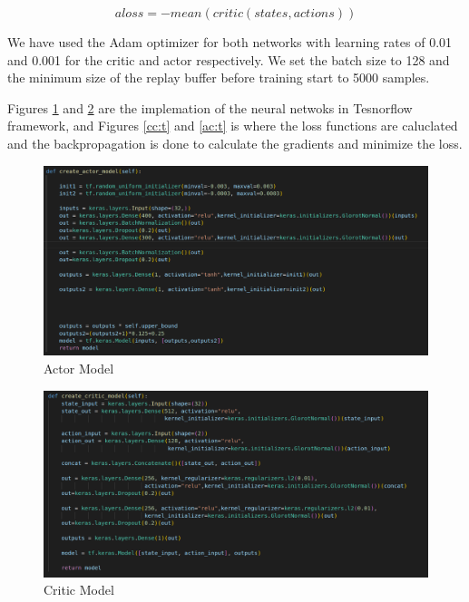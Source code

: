\documentclass[12pt]{extarticle}
\begin{document}
\begin{equation} \label{actor_loss}
     aloss= -mean(critic(states,actions))
   \end{equation}
   
We have used the Adam optimizer for both networks with learning rates of 0.01 and 0.001 for the critic and actor respectively. We set the batch size to 128 and the minimum size of the replay buffer before training start to 5000 samples.

Figures \ref{fig:ac} and \ref{fig:cc} are the implemation of the neural netwoks in Tesnorflow framework, and  Figures \ref{cc:t} and \ref{ac:t} is where the loss functions are caluclated and the backpropagation is done to calculate the gradients and minimize the loss.
 \begin{figure}[H]   
\centering
\includegraphics[scale=0.30]{actor_model}
\caption[Actor model]{Actor Model}
\label{fig:ac}
\end{figure}





 \begin{figure}[H]  
\centering
\includegraphics[scale=0.30]{critic_model}
\caption[Critic model]{Critic Model}
\label{fig:cc}
\end{figure}
\end{document}
